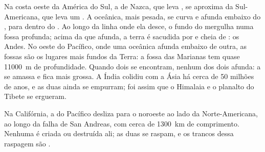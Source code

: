 \begin{example}\label{ex:g7:plate-tectonics:convergent}
Na costa oeste da América do Sul, a  de Nazca, que leva , se
aproxima da  Sul-Americana, que leva um . A  oceânica,
mais pesada, se curva e afunda embaixo do , para dentro do
. Ao longo da linha onde ela desce, o fundo do  mergulha numa fossa
profunda; acima da  que afunda, a terra é sacudida por  e
cheia de : os Andes. No oeste do Pacífico, onde uma  oceânica
afunda embaixo de outra, as fossas são os lugares mais fundos da Terra: a
fossa das Marianas tem quase \qty{11000}{m} de profundidade. Quando dois
 se encontram, nenhum dos dois afunda: a  se amassa e
fica mais grossa. A Índia colidiu com a Ásia há cerca de 50 milhões de
anos, e as duas  ainda se empurram; foi assim que o Himalaia e o
planalto do Tibete se ergueram.
\end{example}

\begin{example}\label{ex:g7:plate-tectonics:transform}
Na Califórnia, a  do Pacífico desliza para o noroeste ao lado da 
Norte-Americana, ao longo da falha de San Andreas, com cerca de
\qty{1300}{km} de comprimento. Nenhuma  é criada ou destruída ali; as
duas  se raspam, e os trancos dessa raspagem são .
\end{example}

